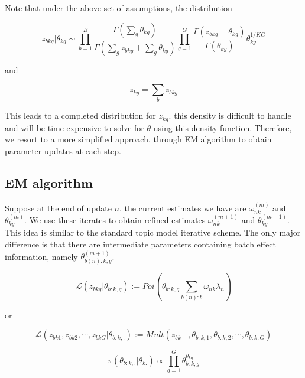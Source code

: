 \documentclass[]{article}
\begin{document}
Note that under the above set of assumptions, the distribution

\begin{equation}
z_{bkg} | \theta_{kg} \sim \prod_{b=1}^{B} \frac{\Gamma (\sum_{g} \theta_{kg})}{\Gamma (\sum_{g} z_{bkg} + \sum_{g} \theta_{kg})} \prod_{g=1}^{G} \frac{\Gamma (z_{bkg} + \theta_{kg})}{\Gamma (\theta_{kg})} \theta^{1/KG}_{kg} 
\label{lab:distr1}
\end{equation}

and

\begin{equation}
z_{kg} = \sum_{b} z_{bkg}
\label{lab:distr2}
\end{equation}

This leads to a completed distribution for \(z_{kg}\). this density is
difficult to handle and will be time expensive to solve for \(\theta\)
using this density function. Therefore, we resort to a more simplified
approach, through EM algorithm to obtain parameter updates at each step.

\subsection{EM algorithm}\label{em-algorithm}

Suppose at the end of update \(n\), the current estimates we have are
\(\omega^{(m)}_{nk}\) and \(\theta^{(m)}_{kg}\). We use these iterates
to obtain refined estimates \(\omega^{(m+1)}_{nk}\) and
\(\theta^{(m+1)}_{kg}\). This idea is similar to the standard topic
model iterative scheme. The only major difference is that there are
intermediate parameters containing batch effect information, namely
\(\theta^{(m+1)}_{b(n):k,g}\).

\begin{equation}
\mathcal{L} (z_{bkg} | \theta_{b:k,g}) := Poi \left (\theta_{b:k,g} \sum_{b(n):b} \omega_{nk}\lambda_{n} \right )  
\label{lab:loglik}
\end{equation}

or

\begin{equation}
\mathcal{L} (z_{bk1}, z_{bk2}, \cdots, z_{bkG} | \theta_{b:k,.}) := Mult \left (z_{bk+}, \theta_{b:k,1}, \theta_{b:k,2}, \cdots, \theta_{b:k,G} \right)
\label{lab:loglik}
\end{equation}

\begin{equation}
\pi(\theta_{b:k,.} | \theta_{k.} ) \propto \prod_{g=1}^{G} \theta_{b:k,g}^{\theta_{kg}}
\label{lab:prior}
\end{equation}
\end{document}
